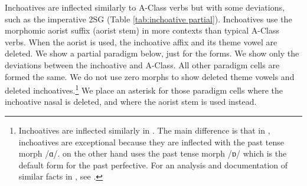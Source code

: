 Inchoatives are inflected similarly to A-Class verbs but with some deviations, such as the imperative 2SG (Table \ref{tab:inchoative partial}). Inchoatives use the morphomic aorist suffix (aorist stem) in more contexts than typical A-Class verbs. When the aorist is used, the inchoative affix and its theme vowel are deleted. We show a partial paradigm below, just for the {\iaIA} forms. We show only the deviations between the inchoative and A-Class. All other paradigm cells are formed the same. We do not use zero morphs to show deleted theme vowels and deleted inchoatives.\footnote{Inchoatives are inflected similarly in {\seaSE}. The main difference is that in {\seaSE}, inchoatives are exceptional because they are inflected with the past tense morph /{ɑ}/. {\iaIA} on the other hand uses the past tense morph /ɒ/ which is the default form for the past perfective. For an analysis and documentation of similar facts in {\swaSWA}, see \citet{DolatianGuekguezian-prep-TierBasedLocalityArmenianConjugationClass}.} We place an asterisk for those paradigm cells where the inchoative nasal is deleted, and where the aorist stem is  used instead.\largerpage


